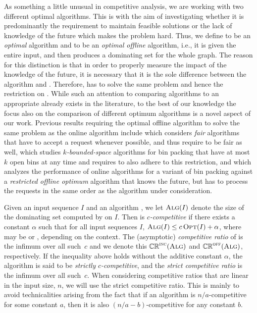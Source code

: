 As something a little unusual in competitive analysis, we are working
with two different optimal algorithms. This is with the aim of
investigating whether it is predominantly the requirement to maintain
feasible solutions or the lack of knowledge of the future which makes
the problem hard.  Thus, we define \onopt to be an \emph{optimal \incr}
algorithm and \offopt to be an \emph{optimal offline}
algorithm, i.e., it is given the entire input, and then produces a
dominating set for the whole graph. The reason for this distinction is
that in order to properly measure the impact of the knowledge of the
future, it is necessary that it is the sole difference between the
algorithm and \opt. Therefore, \opt has to solve the same problem and
hence the restriction on \onopt.  While such an attention to comparing
algorithms to an appropriate \opt already exists in the literature, to
the best of our knowledge the focus also on the comparison of
different optimum algorithms is a novel aspect of our work. Previous
results requiring the optimal offline algorithm to solve the same
problem as the online algorithm include \cite{BL99} which
considers \emph{fair} algorithms that have to accept a request
whenever possible, and thus require \opt to be fair as well,
\cite{ChSW11} which studies \emph{$k$-bounded-space} algorithms for
bin packing that have at most $k$ open bins at any time and requires
\opt to also adhere to this restriction, and \cite{BSV15} which
analyzes the performance of online algorithms for a variant of bin
packing against a \emph{restricted offline optimum} algorithm that
knows the future, but has to process the requests in the same order as
the algorithm under consideration.


Given an input sequence $I$ and an algorithm \ALG,
we let $\operatorname{\textsc{Alg}}(I)$ denote the size of the
dominating set computed by \ALG on $I$.
Then \ALG is
\emph{$c$-competitive} if there exists a constant $\alpha$ such that
for all input sequences $I$, $\operatorname{\textsc{Alg}}(I)\leq c\operatorname{\textsc{Opt}}(I)+\alpha$,
where \opt may be \onopt or \offopt, depending on the context.
The (asymptotic) \emph{competitive ratio} of \ALG is the infimum
over all such~$c$ and we denote this $\mathbb{CR}^{\textsc{\ensuremath{\text{inc}}}}(\operatorname{\textsc{Alg}})$
and $\mathbb{CR}^{\textsc{off}}(\operatorname{\textsc{Alg}})$, respectively.
If the inequality above holds without the additive constant $\alpha$, the
algorithm is said to be {\em strictly $c$-competitive}, and the 
 {\em strict competitive ratio} is the infimum over all such~$c$.
When considering competitive ratios that are linear in the input size,
$n$, we will use the strict competitive ratio.
This is mainly to avoid technicalities arising from the fact that if
an algorithm is $n/a$-competitive for some constant $a$, then it is
also $(n/a-b)$-competitive for any constant $b$.



